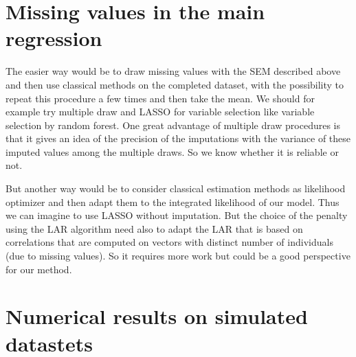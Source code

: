 \documentclass[12pt,a4paper]{report}
\begin{document}
%			
%			
			
	\section{Missing values in the main regression}
		The easier way would be to draw missing values with the SEM described above and then use classical methods on the completed dataset, with the possibility to repeat this procedure a few times and then take the mean. We should for example try multiple draw and LASSO for variable selection like variable selection by random forest. One great advantage of multiple draw procedures is that it gives an idea of the precision of the imputations with the variance of these imputed values among the multiple draws. So we know whether it is reliable or not. 
		
		But another way would be to consider classical estimation methods as likelihood optimizer and then adapt them to the integrated likelihood of our model. Thus we can imagine to use LASSO without imputation. But the choice of the penalty using the LAR algorithm need also to adapt the LAR that is based on correlations that are computed on vectors with distinct number of individuals (due to missing values). So it requires more work but could be a good perspective for our method.
	\section{Numerical results on simulated datastets}
\end{document}
